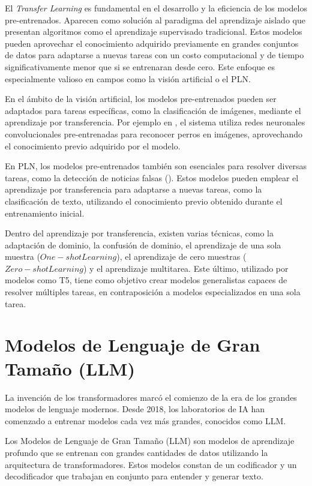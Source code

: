 El \textit{Transfer Learning} es fundamental en el desarrollo y la eficiencia de los modelos pre-entrenados. Aparecen como solución al paradigma del aprendizaje aislado que presentan algoritmos como el aprendizaje supervisado tradicional. Estos modelos pueden aprovechar el conocimiento adquirido previamente en grandes conjuntos de datos para adaptarse a nuevas tareas con un costo computacional y de tiempo significativamente menor que si se entrenaran desde cero. Este enfoque es especialmente valioso en campos como la visión artificial o el PLN.

En el ámbito de la visión artificial, los modelos pre-entrenados pueden ser adaptados para tareas específicas, como la clasificación de imágenes, mediante el aprendizaje por transferencia. Por ejemplo en \cite{tu2018transfer}, el sistema utiliza redes neuronales convolucionales pre-entrenadas para reconocer perros en imágenes, aprovechando el conocimiento previo adquirido por el modelo.

En PLN, los modelos pre-entrenados también son esenciales para resolver diversas tareas, como la detección de noticias falsas (\cite{slovikovskaya2019transfer}). Estos modelos pueden emplear el aprendizaje por transferencia para adaptarse a nuevas tareas, como la clasificación de texto, utilizando el conocimiento previo obtenido durante el entrenamiento inicial.

Dentro del aprendizaje por transferencia, existen varias técnicas, como la adaptación de dominio, la confusión de dominio, el aprendizaje de una sola muestra ($One-shot Learning$), el aprendizaje de cero muestras ($Zero-shot Learning$) y el aprendizaje multitarea. Este último, utilizado por modelos como T5, tiene como objetivo crear modelos generalistas capaces de resolver múltiples tareas, en contraposición a modelos especializados en una sola tarea.

\section{Modelos de Lenguaje de Gran Tamaño (LLM)}
\label{sec:LLM}

La invención de los transformadores marcó el comienzo de la era de los grandes modelos de lenguaje modernos. Desde 2018, los laboratorios de IA han comenzado a entrenar modelos cada vez más grandes, conocidos como LLM.
	
Los Modelos de Lenguaje de Gran Tamaño (LLM) son modelos de aprendizaje profundo que se entrenan con grandes cantidades de datos utilizando la arquitectura de transformadores. Estos modelos constan de un codificador y un decodificador que trabajan en conjunto para entender y generar texto. 

